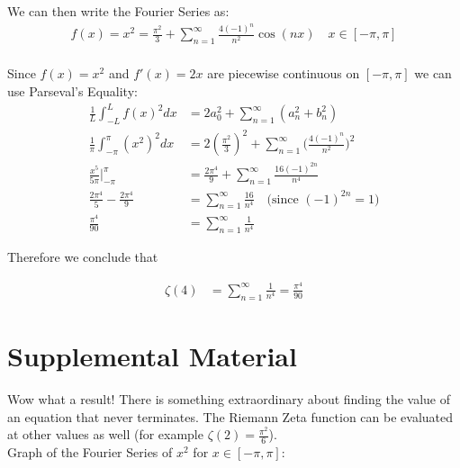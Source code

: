 \documentclass{article}
\begin{document}
\newpage We can then write the Fourier Series as:
\begin{equation} 
\begin{split}
f(x)=x^2=\frac{\pi^2}{3}+\sum_{n=1}^{\infty}\frac{4(-1)^n}{n^2}\cos(nx) \quad x\in [-\pi,\pi]\\
\end{split}
\end{equation}

Since $f(x)=x^2$ and $f'(x)=2x$ are piecewise continuous on $[-\pi,\pi]$ we can use Parseval's Equality: 
\begin{equation} 
\begin{split}
\frac{1}{L}\int_{-L}^{L}f(x)^2dx&=2a_0^2+\sum_{n=1}^{\infty}(a_n^2+b_n^2)\\
\frac{1}{\pi}\int_{-\pi}^{\pi}(x^2)^2dx&=2(\frac{\pi^2}{3})^2+\sum_{n=1}^{\infty}\bigg(\frac{4(-1)^n}{n^2}\bigg)^2\\
\frac{x^5}{5\pi}\big|_{-\pi}^{\pi} &= \frac{2\pi^4}{9}+\sum_{n=1}^{\infty}\frac{16(-1)^{2n}}{n^4}\\
\frac{2\pi^4}{5} - \frac{2\pi^4}{9} &= \sum_{n=1}^{\infty}\frac{16}{n^4} \quad \text{(since $(-1)^{2n}=1$)}\\
\frac{\pi^4}{90} &= \sum_{n=1}^{\infty}\frac{1}{n^4}
\end{split}
\end{equation}

Therefore we conclude that

\begin{equation} 
\begin{split}
\zeta(4) &= \sum_{n=1}^{\infty}\frac{1}{n^4} = \frac{\pi^4}{90}
\end{split}
\end{equation}

\newpage

\section{Supplemental Material}

Wow what a result! There is something extraordinary about finding the value of an equation that never terminates. The Riemann Zeta function can be evaluated at other values as well (for example $\zeta(2)=\frac{\pi^2}{6}$).\\

Graph of the Fourier Series of $x^2$ for $x \in [-\pi,\pi]$:\\
\end{document}
